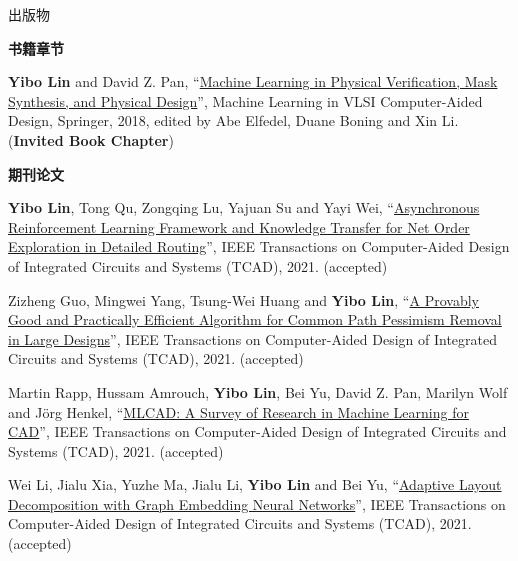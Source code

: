 \begin{rSection}{出版物}



\textbf{书籍章节}
        

\begin{description}[font=\normalfont]
    

\item[{[B1]}]{
        \textbf{Yibo Lin} and David Z. Pan, 
    ``\href{http://dx.doi.org/10.1007/978-3-030-04666-8_4}{Machine Learning in Physical Verification, Mask Synthesis, and Physical Design}'', 
    Machine Learning in VLSI Computer-Aided Design, Springer, 2018, edited by Abe Elfedel, Duane Boning and Xin Li.
    (\textbf{Invited Book Chapter})
}
            

\end{description}
    

\textbf{期刊论文}
        

\begin{description}[font=\normalfont]
    

\item[{[J32]}]{
        \textbf{Yibo Lin}, Tong Qu, Zongqing Lu, Yajuan Su and Yayi Wei, 
    ``\href{https://doi.org/10.1109/TCAD.2021.3117505}{Asynchronous Reinforcement Learning Framework and Knowledge Transfer for Net Order Exploration in Detailed Routing}'', 
    IEEE Transactions on Computer-Aided Design of Integrated Circuits and Systems (TCAD), 2021.
    (accepted)
}
            

\item[{[J31]}]{
        Zizheng Guo, Mingwei Yang, Tsung-Wei Huang and \textbf{Yibo Lin}, 
    ``\href{https://doi.org/10.1109/TCAD.2021.3124758}{A Provably Good and Practically Efficient Algorithm for Common Path Pessimism Removal in Large Designs}'', 
    IEEE Transactions on Computer-Aided Design of Integrated Circuits and Systems (TCAD), 2021.
    (accepted)
}
            

\item[{[J30]}]{
        Martin Rapp, Hussam Amrouch, \textbf{Yibo Lin}, Bei Yu, David Z. Pan, Marilyn Wolf and Jörg Henkel, 
    ``\href{https://doi.org/10.1109/TCAD.2021.3124762}{MLCAD: A Survey of Research in Machine Learning for CAD}'', 
    IEEE Transactions on Computer-Aided Design of Integrated Circuits and Systems (TCAD), 2021.
    (accepted)
}
            

\item[{[J29]}]{
        Wei Li, Jialu Xia, Yuzhe Ma, Jialu Li, \textbf{Yibo Lin} and Bei Yu, 
    ``\href{https://doi.org/10.1109/TCAD.2022.3140729}{Adaptive Layout Decomposition with Graph Embedding Neural Networks}'', 
    IEEE Transactions on Computer-Aided Design of Integrated Circuits and Systems (TCAD), 2021.
    (accepted)
}
            


\end{description}
\end{rSection}

